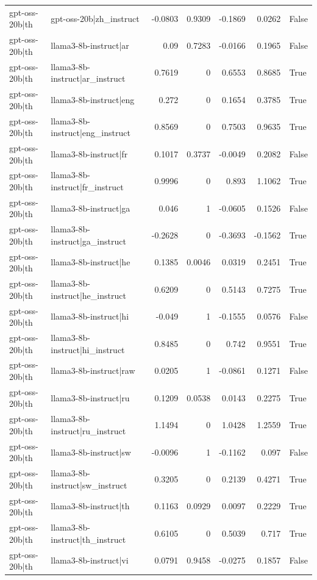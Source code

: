 \begin{table}
\begin{tabular}{l l r r r r l}
gpt-oss-20b|th & gpt-oss-20b|zh_instruct & -0.0803 & 0.9309 & -0.1869 & 0.0262 & False \\
gpt-oss-20b|th & llama3-8b-instruct|ar & 0.09 & 0.7283 & -0.0166 & 0.1965 & False \\
gpt-oss-20b|th & llama3-8b-instruct|ar_instruct & 0.7619 & 0 & 0.6553 & 0.8685 & True \\
gpt-oss-20b|th & llama3-8b-instruct|eng & 0.272 & 0 & 0.1654 & 0.3785 & True \\
gpt-oss-20b|th & llama3-8b-instruct|eng_instruct & 0.8569 & 0 & 0.7503 & 0.9635 & True \\
gpt-oss-20b|th & llama3-8b-instruct|fr & 0.1017 & 0.3737 & -0.0049 & 0.2082 & False \\
gpt-oss-20b|th & llama3-8b-instruct|fr_instruct & 0.9996 & 0 & 0.893 & 1.1062 & True \\
gpt-oss-20b|th & llama3-8b-instruct|ga & 0.046 & 1 & -0.0605 & 0.1526 & False \\
gpt-oss-20b|th & llama3-8b-instruct|ga_instruct & -0.2628 & 0 & -0.3693 & -0.1562 & True \\
gpt-oss-20b|th & llama3-8b-instruct|he & 0.1385 & 0.0046 & 0.0319 & 0.2451 & True \\
gpt-oss-20b|th & llama3-8b-instruct|he_instruct & 0.6209 & 0 & 0.5143 & 0.7275 & True \\
gpt-oss-20b|th & llama3-8b-instruct|hi & -0.049 & 1 & -0.1555 & 0.0576 & False \\
gpt-oss-20b|th & llama3-8b-instruct|hi_instruct & 0.8485 & 0 & 0.742 & 0.9551 & True \\
gpt-oss-20b|th & llama3-8b-instruct|raw & 0.0205 & 1 & -0.0861 & 0.1271 & False \\
gpt-oss-20b|th & llama3-8b-instruct|ru & 0.1209 & 0.0538 & 0.0143 & 0.2275 & True \\
gpt-oss-20b|th & llama3-8b-instruct|ru_instruct & 1.1494 & 0 & 1.0428 & 1.2559 & True \\
gpt-oss-20b|th & llama3-8b-instruct|sw & -0.0096 & 1 & -0.1162 & 0.097 & False \\
gpt-oss-20b|th & llama3-8b-instruct|sw_instruct & 0.3205 & 0 & 0.2139 & 0.4271 & True \\
gpt-oss-20b|th & llama3-8b-instruct|th & 0.1163 & 0.0929 & 0.0097 & 0.2229 & True \\
gpt-oss-20b|th & llama3-8b-instruct|th_instruct & 0.6105 & 0 & 0.5039 & 0.717 & True \\
gpt-oss-20b|th & llama3-8b-instruct|vi & 0.0791 & 0.9458 & -0.0275 & 0.1857 & False \\

\end{tabular}
\end{table}
